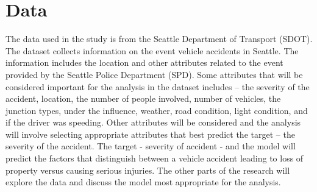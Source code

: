 \documentclass[a4paper,12pt]{article}
\begin{document}
\section{Data}
The data used in the study is from the Seattle Department of Transport (SDOT). The dataset collects information on the event vehicle accidents in Seattle. The information includes the location and other attributes related to the event provided by the Seattle Police Department (SPD). Some attributes that will be considered important for the analysis in the dataset includes – the severity of the accident, location, the number of people involved, number of vehicles, the junction types, under the influence, weather, road condition, light condition, and if the driver was speeding. Other attributes will be considered and the analysis will involve selecting appropriate attributes that best predict the target – the severity of the accident. The target - severity of accident -  and the model will predict the factors that distinguish between a vehicle accident leading to loss of property versus causing serious injuries. The other parts of the research will explore the data and discuss the model most appropriate for the analysis.
\end{document}

